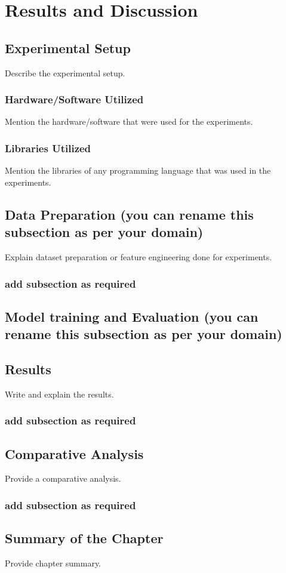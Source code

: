 \chapter{Results and Discussion} %
\label{cha:_Framework}

\section{Experimental Setup}
Describe the experimental setup.
\subsection{Hardware/Software Utilized}
Mention the hardware/software that were used for the experiments.
\subsection{Libraries Utilized}
Mention the libraries of any programming language that was used in the experiments.


\section{Data Preparation (you can rename this subsection as per your domain)}
Explain dataset preparation or feature engineering done for experiments.
\subsection{add subsection as required}

\section{Model training and Evaluation (you can rename this subsection as per your domain)}

\section{Results}
Write and explain the results.
\subsection{add subsection as required}

\section{Comparative Analysis}
Provide a comparative analysis.

\subsection{add subsection as required}
\section{Summary of the Chapter}
Provide chapter summary.